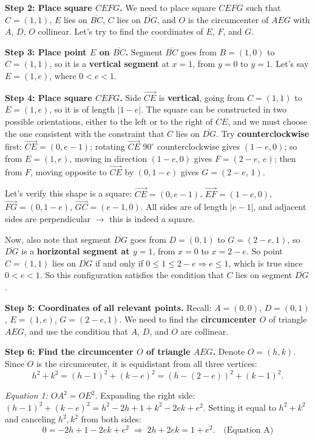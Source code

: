 \begin{ReasoningBox}[title={Case Study: Math Reasoning (Smaller \& Larger Setting)}, breakable]
\textbf{Step 2: Place square $CEFG$.} We need to place square $CEFG$ such that $C = (1,1)$, $E$ lies on $\overline{BC}$, $C$ lies on $\overline{DG}$, and $O$ is the circumcenter of $AEG$ with $A$, $D$, $O$ collinear. Let's try to find the coordinates of $E$, $F$, and $G$.

\textbf{Step 3: Place point $E$ on $\overline{BC}$.} Segment $\overline{BC}$ goes from $B = (1,0)$ to $C = (1,1)$, so it is a \textbf{vertical segment} at $x = 1$, from $y = 0$ to $y = 1$. Let's say $E = (1, e)$, where $0 < e < 1$.

\textbf{Step 4: Place square $CEFG$.} Side $\overrightarrow{CE}$ is \textbf{vertical}, going from $C = (1,1)$ to $E = (1,e)$, so it is of length $|1 - e|$. The square can be constructed in two possible orientations, either to the left or to the right of $CE$, and we must choose the one consistent with the constraint that $C$ lies on $\overline{DG}$. Try \textbf{counterclockwise} first: $\vec{CE} = (0, e - 1)$; rotating $\vec{CE}$ $90^\circ$ counterclockwise gives $(1 - e, 0)$; so from $E = (1,e)$, moving in direction $(1-e, 0)$ gives $F = (2 - e,\, e)$; then from $F$, moving opposite to $\vec{CE}$ by $(0, 1-e)$ gives $G = (2 - e,\, 1)$.

Let's verify this shape is a square: $\vec{CE} = (0, e-1)$, $\vec{EF} = (1-e, 0)$, $\vec{FG} = (0, 1-e)$, $\vec{GC} = (e-1, 0)$. All sides are of length $|e-1|$, and adjacent sides are perpendicular $\to$ this is indeed a square.

Now, also note that segment $\overline{DG}$ goes from $D = (0,1)$ to $G = (2-e, 1)$, so $\overline{DG}$ is a \textbf{horizontal segment at $y = 1$}, from $x = 0$ to $x = 2-e$. So point $C = (1,1)$ lies on $\overline{DG}$ if and only if $0 \le 1 \le 2 - e \Rightarrow e \le 1$, which is true since $0 < e < 1$.  So this configuration satisfies the condition that $C$ lies on segment $\overline{DG}$.

\textbf{Step 5: Coordinates of all relevant points.} Recall: $A = (0,0)$, $D = (0,1)$, $E = (1,e)$, $G = (2-e, 1)$. We need to find the \textbf{circumcenter $O$} of triangle $AEG$, and use the condition that $A$, $D$, and $O$ are collinear.

\textbf{Step 6: Find the circumcenter $O$ of triangle $AEG$.} Denote $O = (h,k)$. Since $O$ is the circumcenter, it is equidistant from all three vertices:
\[
h^2 + k^2 = (h - 1)^2 + (k - e)^2 = (h - (2 - e))^2 + (k - 1)^2.
\]

\textit{Equation 1: $OA^2 = OE^2$.} Expanding the right side: $(h-1)^2 + (k-e)^2 = h^2 - 2h + 1 + k^2 - 2ek + e^2$. Setting it equal to $h^2 + k^2$ and canceling $h^2, k^2$ from both sides:
\[
0 = -2h + 1 - 2ek + e^2 \;\Longrightarrow\; 2h + 2ek = 1 + e^2. \quad \text{(Equation A)}
\]


\end{ReasoningBox}
